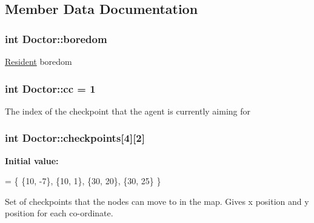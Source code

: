 \subsection{Member Data Documentation}
\hypertarget{classDoctor_a76dcb7e1308ef8001b7960cb542e3824}{
\subsubsection[{boredom}]{\setlength{\rightskip}{0pt plus 5cm}int Doctor\-::boredom\hspace{0.3cm}{\ttfamily [protected]}}}\label{classDoctor_a76dcb7e1308ef8001b7960cb542e3824}
\hyperlink{classResident}{Resident} boredom \hypertarget{classDoctor_a254303eb3ae4982340eb079ea76e942a}{
\subsubsection[{cc}]{\setlength{\rightskip}{0pt plus 5cm}int Doctor\-::cc = 1\hspace{0.3cm}{\ttfamily [protected]}}}\label{classDoctor_a254303eb3ae4982340eb079ea76e942a}
The index of the checkpoint that the agent is currently aiming for \hypertarget{classDoctor_a9bb025d7f8f843371b1c63414272afe1}{
\subsubsection[{checkpoints}]{\setlength{\rightskip}{0pt plus 5cm}int Doctor\-::checkpoints\mbox{[}4\mbox{]}\mbox{[}2\mbox{]}\hspace{0.3cm}{\ttfamily [protected]}}}\label{classDoctor_a9bb025d7f8f843371b1c63414272afe1}
{\bfseries Initial value\-:}
\begin{DoxyCode}
= \{
            \{10, -7\},
            \{10, 1\},
            \{30, 20\},
            \{30, 25\}
            \}
\end{DoxyCode}


Set of checkpoints that the nodes can move to in the map. Gives x position and y position for each co-\/ordinate. 

